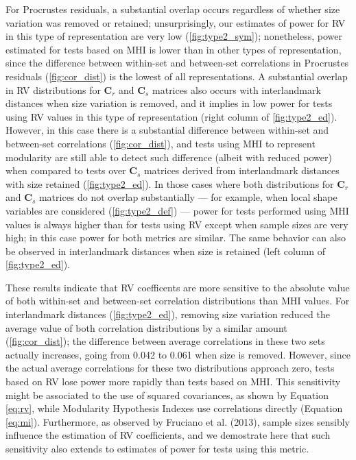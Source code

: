 \documentclass[12pt,]{article}
\begin{document}
For Procrustes residuals, a substantial overlap occurs regardless of
whether size variation was removed or retained; unsurprisingly, our
estimates of power for RV in this type of representation are very low
(\autoref{fig:type2_sym}); nonetheless, power estimated for tests based
on MHI is lower than in other types of representation, since the
difference between within-set and between-set correlations in Procrustes
residuals (\autoref{fig:cor_dist}) is the lowest of all representations.
A substantial overlap in RV distributions for $\mathbf{C}_r$ and
$\mathbf{C}_s$ matrices also occurs with interlandmark distances when
size variation is removed, and it implies in low power for tests using
RV values in this type of representation (right column of
\autoref{fig:type2_ed}). However, in this case there is a substantial
difference between within-set and between-set correlations
(\autoref{fig:cor_dist}), and tests using MHI to represent modularity
are still able to detect such difference (albeit with reduced power)
when compared to tests over $\mathbf{C}_s$ matrices derived from
interlandmark distances with size retained (\autoref{fig:type2_ed}). In
those cases where both distributions for $\mathbf{C}_r$ and
$\mathbf{C}_s$ matrices do not overlap substantially --- for example,
when local shape variables are considered (\autoref{fig:type2_def}) ---
power for tests performed using MHI values is always higher than for
tests using RV except when sample sizes are very high; in this case
power for both metrics are similar. The same behavior can also be
observed in interlandmark distances when size is retained (left column
of \autoref{fig:type2_ed}).

These results indicate that RV coefficents are more sensitive to the
absolute value of both within-set and between-set correlation
distributions than MHI values. For interlandmark distances
(\autoref{fig:type2_ed}), removing size variation reduced the average
value of both correlation distributions by a similar amount
(\autoref{fig:cor_dist}); the difference between average correlations in
these two sets actually increases, going from 0.042 to 0.061 when size
is removed. However, since the actual average correlations for these two
distributions approach zero, tests based on RV lose power more rapidly
than tests based on MHI. This sensitivity might be associated to the use
of squared covariances, as shown by Equation \ref{eq:rv}, while
Modularity Hypothesis Indexes use correlations directly (Equation
\ref{eq:mi}). Furthermore, as observed by Fruciano et al. (2013), sample
sizes sensibly influence the estimation of RV coefficients, and we
demostrate here that such sensitivity also extends to estimates of power
for tests using this metric.
\end{document}
